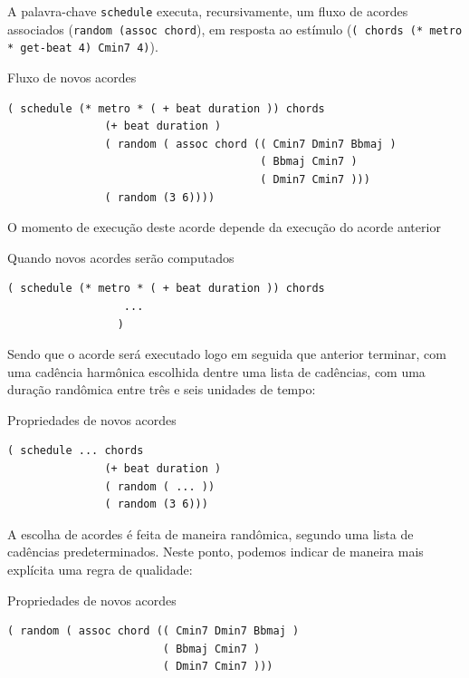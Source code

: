 A palavra-chave \verb|schedule| executa, recursivamente, um fluxo de acordes associados (\verb|random (assoc chord|), em resposta ao estímulo (\verb|( chords (* metro * get-beat 4) Cmin7 4)|). 

\begin{example}{Fluxo de novos acordes}
\begin{verbatim}
( schedule (* metro * ( + beat duration )) chords
               (+ beat duration )
               ( random ( assoc chord (( Cmin7 Dmin7 Bbmaj )
                                       ( Bbmaj Cmin7 )
                                       ( Dmin7 Cmin7 )))
               ( random (3 6))))
\end{verbatim}
\end{example}

O momento de execução deste acorde depende da execução do acorde anterior

\begin{example}{Quando novos acordes serão computados}
\begin{verbatim}
( schedule (* metro * ( + beat duration )) chords
                  ...
                 )
\end{verbatim}
\end{example}

Sendo que o acorde será executado logo em seguida que anterior terminar, com uma cadência harmônica escolhida dentre uma lista de cadências, com uma duração randômica entre três e seis unidades de tempo:

\begin{example}{Propriedades de novos acordes}
\begin{verbatim}
( schedule ... chords
               (+ beat duration )
               ( random ( ... ))
               ( random (3 6)))
\end{verbatim}
\end{example}

A escolha de acordes é feita de maneira randômica, segundo uma lista de cadências predeterminados. Neste ponto, podemos indicar de maneira mais explícita uma regra de qualidade:

\begin{example}{Propriedades de novos acordes}
\begin{verbatim}
( random ( assoc chord (( Cmin7 Dmin7 Bbmaj )
                        ( Bbmaj Cmin7 )
                        ( Dmin7 Cmin7 )))
\end{verbatim}
\end{example}

